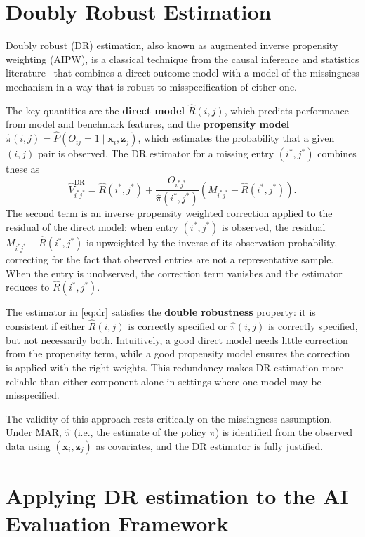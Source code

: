 \documentclass{article}
\begin{document}
\section{Doubly Robust Estimation}
Doubly robust (DR) estimation, also known as augmented inverse propensity weighting (AIPW), is a classical technique from the causal inference and statistics literature~\citep{kang2007demystifying} that combines a direct outcome model with a model of the missingness mechanism in a way that is robust to misspecification of either one.

The key quantities are the \textbf{direct model} $\hat{R}(i,j)$, which predicts performance from model and benchmark features, and the \textbf{propensity model} $\hat{\pi}(i,j) = \hat{P}(O_{ij} = 1 \mid \mathbf{x}_i, \mathbf{z}_j)$, which estimates the probability that a given $(i,j)$ pair is observed. The DR estimator for a missing entry $(i^*, j^*)$ combines these as
\begin{equation}
    \hat{V}^{\mathrm{DR}}_{i^*j^*} = \hat{R}(i^*, j^*) + \frac{O_{i^*j^*}}{\hat{\pi}(i^*, j^*)}\left(M_{i^*j^*} - \hat{R}(i^*, j^*)\right).
    \label{eq:dr}
\end{equation}
The second term is an inverse propensity weighted correction applied to the residual of the direct model: when entry $(i^*, j^*)$ is observed, the residual $M_{i^*j^*} - \hat{R}(i^*, j^*)$ is upweighted by the inverse of its observation probability, correcting for the fact that observed entries are not a representative sample. When the entry is unobserved, the correction term vanishes and the estimator reduces to $\hat{R}(i^*, j^*)$.

The estimator in \eqref{eq:dr} satisfies the \textbf{double robustness} property: it is consistent if either $\hat{R}(i,j)$ is correctly specified or $\hat{\pi}(i,j)$ is correctly specified, but not necessarily both. Intuitively, a good direct model needs little correction from the propensity term, while a good propensity model ensures the correction is applied with the right weights. This redundancy makes DR estimation more reliable than either component alone in settings where one model may be misspecified.

The validity of this approach rests critically on the missingness assumption. Under MAR, $\hat{\pi}$ (i.e., the estimate of the policy $\pi$) is identified from the observed data using $(\mathbf{x}_i, \mathbf{z}_j)$ as covariates, and the DR estimator is fully justified. 

\section{Applying DR estimation to the AI Evaluation Framework}
\end{document}
